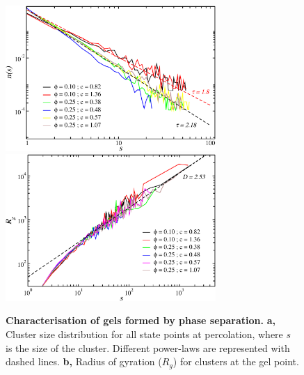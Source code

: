 \documentclass[a4paper,preprint,superscriptaddress]{revtex4}
\begin{document}



\clearpage

\begin{figure}[!t]
 \centering
 \includegraphics[width=8cm,clip]{fig1a}
  \includegraphics[width=8cm]{fig1b}
 \caption{{\bf Characterisation of gels formed by phase separation.} {\bf a,} 
 Cluster size distribution for all state points at percolation, where $s$ is the size of the cluster. Different power-laws are represented with dashed lines. 
{\bf b,} Radius of gyration ($R_g$) for clusters at the gel point.}
 \label{fig:gel}
\end{figure}

\clearpage
\end{document}
